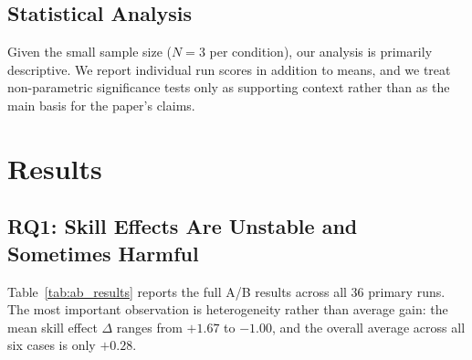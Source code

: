 ﻿\documentclass[preprint,12pt]{elsarticle}
\begin{document}
\subsection{Statistical Analysis}

Given the small sample size ($N=3$ per condition), our analysis is
primarily descriptive.  We report individual run scores in addition to
means, and we treat non-parametric significance tests only as supporting
context rather than as the main basis for the paper's claims.

\section{Results}
\label{sec:results}

\subsection{RQ1: Skill Effects Are Unstable and Sometimes Harmful}
\label{sec:results_rq1}

Table~\ref{tab:ab_results} reports the full A/B results across all 36
primary runs.  The most important observation is heterogeneity rather than
average gain: the mean skill effect $\Delta$ ranges from $+1.67$ to
$-1.00$, and the overall average across all six cases is only $+0.28$.
\end{document}
